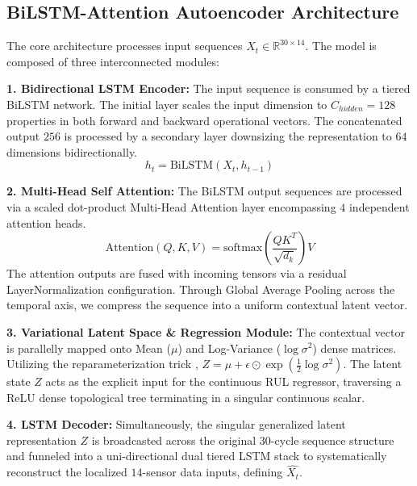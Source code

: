 \documentclass[conference]{IEEEtran}
\begin{document}
\subsection{BiLSTM-Attention Autoencoder Architecture}
The core architecture processes input sequences $X_t \in \mathbb{R}^{30 \times 14}$. The model is composed of three interconnected modules:

\textbf{1. Bidirectional LSTM Encoder:} The input sequence is consumed by a tiered BiLSTM network. The initial layer scales the input dimension to $C_{hidden}=128$ properties in both forward and backward operational vectors. The concatenated output $256$ is processed by a secondary layer downsizing the representation to $64$ dimensions bidirectionally.
\begin{equation}
    h_t = \text{BiLSTM}(X_t, h_{t-1})
\end{equation}

\textbf{2. Multi-Head Self Attention:} The BiLSTM output sequences are processed via a scaled dot-product Multi-Head Attention layer encompassing $4$ independent attention heads. 
\begin{equation}
    \text{Attention}(Q, K, V) = \text{softmax}\left(\frac{QK^T}{\sqrt{d_k}}\right)V
\end{equation}
The attention outputs are fused with incoming tensors via a residual LayerNormalization configuration. Through Global Average Pooling across the temporal axis, we compress the sequence into a uniform contextual latent vector.

\textbf{3. Variational Latent Space \& Regression Module:}
The contextual vector is parallelly mapped onto Mean ($\mu$) and Log-Variance ($\log\sigma^2$) dense matrices. Utilizing the reparameterization trick \cite{vae_kl}, $Z = \mu + \epsilon \odot \exp(\frac{1}{2}\log\sigma^2)$. The latent state $Z$ acts as the explicit input for the continuous RUL regressor, traversing a ReLU dense topological tree terminating in a singular continuous scalar.

\textbf{4. LSTM Decoder:}
Simultaneously, the singular generalized latent representation $Z$ is broadcasted across the original $30$-cycle sequence structure and funneled into a uni-directional dual tiered LSTM stack to systematically reconstruct the localized $14$-sensor data inputs, defining $\hat{X_t}$.
\end{document}
